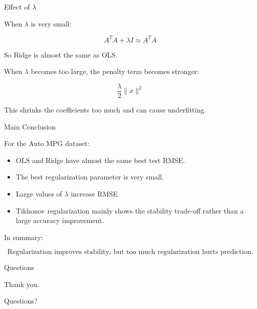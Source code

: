 \documentclass[aspectratio=169]{beamer}
\begin{document}
\begin{frame}{Effect of \(\lambda\)}

When \(\lambda\) is very small:

\[
A^TA+\lambda I \approx A^TA
\]

So Ridge is almost the same as OLS.

\medskip

When \(\lambda\) becomes too large, the penalty term becomes stronger:

\[
\frac{\lambda}{2}\|x\|^2
\]

This shrinks the coefficients too much and can cause underfitting.

\end{frame}

\begin{frame}{Main Conclusion}

For the Auto MPG dataset:

\begin{itemize}
    \item OLS and Ridge have almost the same best test RMSE.
    \item The best regularization parameter is very small.
    \item Large values of \(\lambda\) increase RMSE.
    \item Tikhonov regularization mainly shows the stability trade-off rather than a large accuracy improvement.
\end{itemize}

\medskip

In summary:

\[
\text{Regularization improves stability, but too much regularization hurts prediction.}
\]

\end{frame}

\begin{frame}{Questions}

\centering
\Large Thank you.

\medskip

Questions?

\end{frame}
\end{document}
